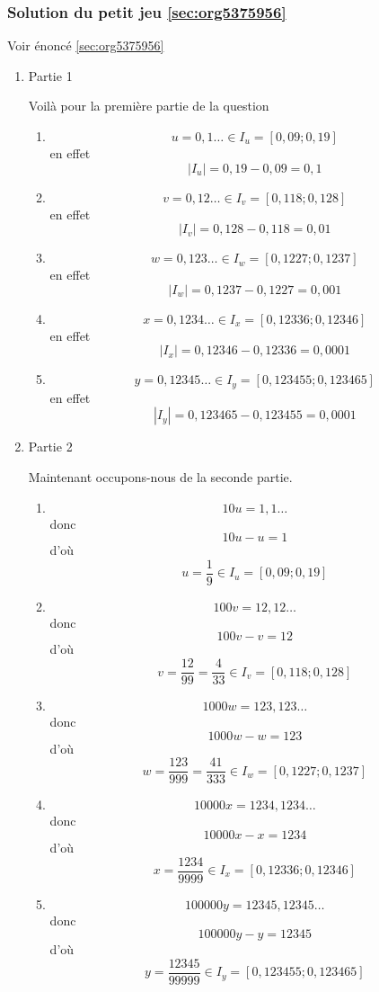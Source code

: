 \documentclass[a4paper, 11pt, twoside]{article}
\begin{document}
\subsubsection{Solution du petit jeu \ref{sec:org5375956}}
\label{sec:orga1e3d2e}
Voir énoncé \ref{sec:org5375956}

\begin{enumerate}
\item Partie 1
\label{sec:org911d181}

Voilà pour la première partie de la question

\begin{enumerate}
\item \[u = 0,1\dots\in I_u = [0,09 ; 0,19]\] en effet \[|I_u| = 0,19 - 0,09 = 0,1\]
\item \[v = 0,12\dots\in I_v = [0,118 ; 0,128]\] en effet \[|I_v| = 0,128 - 0,118 =
      0,01\]
\item \[w = 0,123\dots\in I_w = [0,1227 ; 0,1237]\] en effet \[|I_w| = 0,1237 - 0,1227
      = 0,001\]
\item \[x = 0,1234\dots\in I_x = [0,12336 ; 0,12346]\] en effet \[|I_x| =
      0,12346 - 0,12336 = 0,0001\]
\item \[y = 0,12345\dots\in I_y = [0,123455 ; 0,123465]\] en effet
\[|I_y| = 0,123465 - 0,123455 = 0,0001\]
\end{enumerate}

\item Partie 2
\label{sec:org277cb68}

Maintenant occupons-nous de la seconde partie.

\begin{enumerate}
\item \[10u = 1,1\dots\] donc \[10u - u = 1\] d'où \[u = \dfrac{1}{9}\in
      I_u = [0,09 ; 0,19]\]
\item \[100v = 12,12\dots\] donc \[100v - v = 12\] d'où \[v = \dfrac{12}{99}
      = \dfrac{4}{33}\in I_v = [0,118 ; 0,128]\]
\item \[1000w = 123,123\dots\] donc \[1000w - w = 123\] d'où \[w =
      \dfrac{123}{999} = \dfrac{41}{333}\in I_w = [0,1227 ; 0,1237]\]
\item \[10000x = 1234,1234\dots\] donc \[10000x - x = 1234\] d'où \[x =
      \dfrac{1234}{9999}\in I_x = [0,12336 ; 0,12346]\]
\item \[100000y = 12345,12345\dots\] donc \[100000y - y = 12345\] d'où \[y
      = \dfrac{12345}{99999}\in I_y = [0,123455 ; 0,123465]\]
\end{enumerate}
\end{enumerate}
\stopcontents[level-2]
\end{document}
